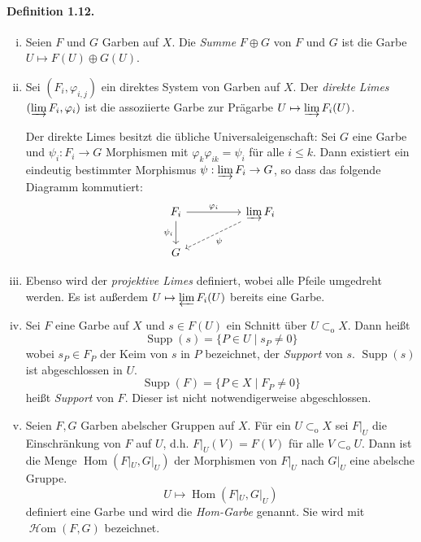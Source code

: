 \documentclass[11pt,b5paper,openany]{memoir}
\begin{document}
\paragraph{Definition 1.12.}\label{1.12} \begin{enumerate}[(i)]
\item Seien $F$ und $G$ Garben auf $X$. Die \textit{Summe} $F\oplus G$ von $F$ und $G$ ist die Garbe $U\mapsto F(U)\oplus G(U)$.
\item Sei $(F_i,\varphi_{i,j})$ ein direktes System von Garben auf $X$. Der \textit{direkte Limes} $(\varinjlim F_i,\varphi_i)$ ist die assoziierte Garbe zur Prägarbe $U\mapsto \varinjlim F_i(U)$.

Der direkte Limes besitzt die übliche Universaleigenschaft: Sei $G$ eine Garbe und $\psi_i:F_i\to G$ Morphismen mit $\varphi_k\varphi_{ik}=\psi_i$ für alle $i\leq k$. Dann existiert ein eindeutig bestimmter Morphismus $\psi:\varinjlim F_i\to G$, so dass das folgende Diagramm kommutiert:
\[\begin{tikzcd}
F_i\ar[rr, "\varphi_i"]\ar[d, "\psi_i"'] & & \varinjlim F_i\ar[lld, "\psi", dashed]\\
G
\end{tikzcd} \]
\item Ebenso wird der \textit{projektive Limes} definiert, wobei alle Pfeile umgedreht werden. Es ist außerdem $U\mapsto\varprojlim F_i(U)$ bereits eine Garbe.
\item Sei $F$ eine Garbe auf $X$ und $s\in F(U)$ ein Schnitt über $U\subset_\text{o}X$. Dann heißt
\[\operatorname{Supp}(s)=\{P\in U\mid s_P\neq 0\} \]
wobei $s_P\in F_P$ der Keim von $s$ in $P$ bezeichnet, der \textit{Support} von $s$. $\operatorname{Supp}(s)$ ist abgeschlossen in $U$.
\[\operatorname{Supp}(F)=\{P\in X\mid F_P\neq 0\} \]
heißt \textit{Support} von $F$. Dieser ist nicht notwendigerweise abgeschlossen.
\item Seien $F,G$ Garben abelscher Gruppen auf $X$. Für ein $U\subset_\text{o}X$ sei $F|_U$ die Einschränkung von $F$ auf $U$, d.h. $F|_U(V)=F(V)$ für alle $V\subset_\text{o}U$. Dann ist die Menge $\operatorname{Hom}(F|_U,G|_U)$ der Morphismen von $F|_U$ nach $G|_U$ eine abelsche Gruppe.
\[U\mapsto\operatorname{Hom}(F|_U,G|_U)\]
definiert eine Garbe und wird die \textit{Hom-Garbe} genannt. Sie wird mit $\operatorname{\mathcal{H}om}(F,G)$ bezeichnet.
\end{enumerate} 
\end{document}
